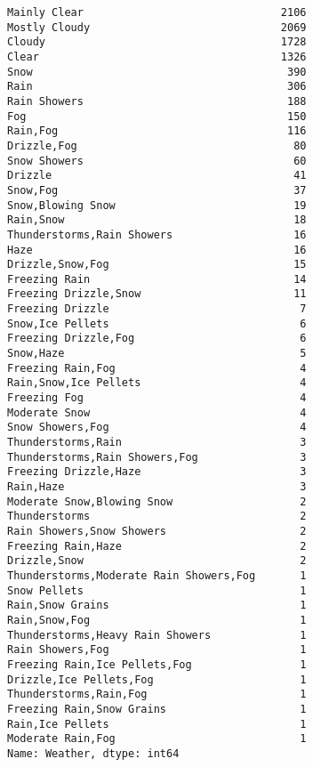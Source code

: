 \documentclass[11pt]{article}
\makeatletter
\newcommand{\boxspacing}{\kern\kvtcb@left@rule\kern\kvtcb@boxsep}
\newcommand{\prompt}[4]{
        {\ttfamily\llap{{\color{#2}[#3]:\hspace{3pt}#4}}\vspace{-\baselineskip}}
    }
\makeatother
\begin{document}
            \begin{tcolorbox}[breakable, size=fbox, boxrule=.5pt, pad at break*=1mm, opacityfill=0]
\prompt{Out}{outcolor}{19}{\boxspacing}
\begin{Verbatim}[commandchars=\\\{\}]
Mainly Clear                               2106
Mostly Cloudy                              2069
Cloudy                                     1728
Clear                                      1326
Snow                                        390
Rain                                        306
Rain Showers                                188
Fog                                         150
Rain,Fog                                    116
Drizzle,Fog                                  80
Snow Showers                                 60
Drizzle                                      41
Snow,Fog                                     37
Snow,Blowing Snow                            19
Rain,Snow                                    18
Thunderstorms,Rain Showers                   16
Haze                                         16
Drizzle,Snow,Fog                             15
Freezing Rain                                14
Freezing Drizzle,Snow                        11
Freezing Drizzle                              7
Snow,Ice Pellets                              6
Freezing Drizzle,Fog                          6
Snow,Haze                                     5
Freezing Rain,Fog                             4
Rain,Snow,Ice Pellets                         4
Freezing Fog                                  4
Moderate Snow                                 4
Snow Showers,Fog                              4
Thunderstorms,Rain                            3
Thunderstorms,Rain Showers,Fog                3
Freezing Drizzle,Haze                         3
Rain,Haze                                     3
Moderate Snow,Blowing Snow                    2
Thunderstorms                                 2
Rain Showers,Snow Showers                     2
Freezing Rain,Haze                            2
Drizzle,Snow                                  2
Thunderstorms,Moderate Rain Showers,Fog       1
Snow Pellets                                  1
Rain,Snow Grains                              1
Rain,Snow,Fog                                 1
Thunderstorms,Heavy Rain Showers              1
Rain Showers,Fog                              1
Freezing Rain,Ice Pellets,Fog                 1
Drizzle,Ice Pellets,Fog                       1
Thunderstorms,Rain,Fog                        1
Freezing Rain,Snow Grains                     1
Rain,Ice Pellets                              1
Moderate Rain,Fog                             1
Name: Weather, dtype: int64
\end{Verbatim}
\end{tcolorbox}
        
\end{document}
